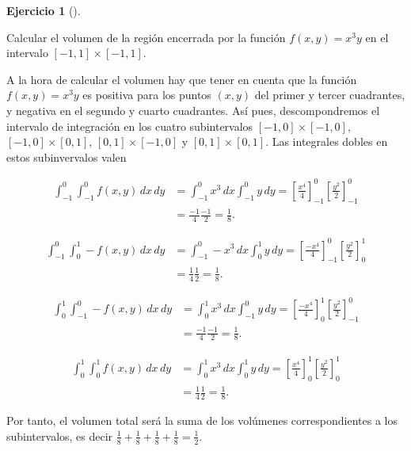 \documentclass[
  spanish,
  a4paper,
]{scrreport}
\theoremstyle{definition}
\newtheorem{exercise}{Ejercicio}[chapter]
\theoremstyle{remark}
\begin{document}
\begin{exercise}[]\protect\hypertarget{exr-volumne-funcion-positiva-negativa}{}\label{exr-volumne-funcion-positiva-negativa}

Calcular el volumen de la región encerrada por la función
\(f(x,y)=x^3y\) en el intervalo \([-1,1]\times[-1,1]\).

\end{exercise}

\begin{tcolorbox}[enhanced jigsaw, arc=.35mm, bottomrule=.15mm, bottomtitle=1mm, breakable, colback=white, colbacktitle=quarto-callout-tip-color!10!white, colframe=quarto-callout-tip-color-frame, coltitle=black, left=2mm, leftrule=.75mm, opacityback=0, opacitybacktitle=0.6, rightrule=.15mm, title=\textcolor{quarto-callout-tip-color}{\faLightbulb}\hspace{0.5em}{Solución}, titlerule=0mm, toprule=.15mm, toptitle=1mm]

A la hora de calcular el volumen hay que tener en cuenta que la función
\(f(x,y)=x^3y\) es positiva para los puntos \((x,y)\) del primer y
tercer cuadrantes, y negativa en el segundo y cuarto cuadrantes. Así
pues, descompondremos el intervalo de integración en los cuatro
subintervalos \([-1,0]\times[-1,0]\), \([-1,0]\times[0,1]\),
\([0,1]\times[-1,0]\) y \([0,1]\times[0,1]\). Las integrales dobles en
estos subinvervalos valen

\begin{align*}
\int_{-1}^0\int_{-1}^0 f(x,y)\,dx\,dy
& = \int_{-1}^0x^3\,dx \int_{-1}^0 y\,dy 
= \left[\frac{x^4}{4}\right]_{-1}^0 \left[\frac{y^2}{2}\right]_{-1}^0 \\
&= \frac{-1}{4}\frac{-1}{2}
= \frac{1}{8}.
\end{align*}

\begin{align*}
\int_{-1}^0\int_{0}^1 -f(x,y)\,dx\,dy
& = \int_{-1}^0 -x^3\,dx \int_{0}^1 y\,dy 
= \left[\frac{-x^4}{4}\right]_{-1}^0 \left[\frac{y^2}{2}\right]_{0}^1 \\
&= \frac{1}{4}\frac{1}{2}
= \frac{1}{8}.
\end{align*}

\begin{align*}
\int_{0}^1\int_{-1}^0 -f(x,y)\,dx\,dy
& = \int_{0}^1 x^3\,dx \int_{-1}^0 y\,dy 
= \left[\frac{-x^4}{4}\right]_{0}^1 \left[\frac{y^2}{2}\right]_{-1}^0 \\
&= \frac{-1}{4}\frac{-1}{2}
= \frac{1}{8}.
\end{align*}

\begin{align*}
\int_{0}^1\int_{0}^1 f(x,y)\,dx\,dy
& = \int_{0}^1 x^3\,dx \int_{0}^1 y\,dy 
= \left[\frac{x^4}{4}\right]_{0}^1 \left[\frac{y^2}{2}\right]_{0}^1 \\
&= \frac{1}{4}\frac{1}{2}
= \frac{1}{8}.
\end{align*}

Por tanto, el volumen total será la suma de los volúmenes
correspondientes a los subintervalos, es decir
\(\frac{1}{8} + \frac{1}{8} + \frac{1}{8} + \frac{1}{8} = \frac{1}{2}\).

\end{tcolorbox}
\end{document}
